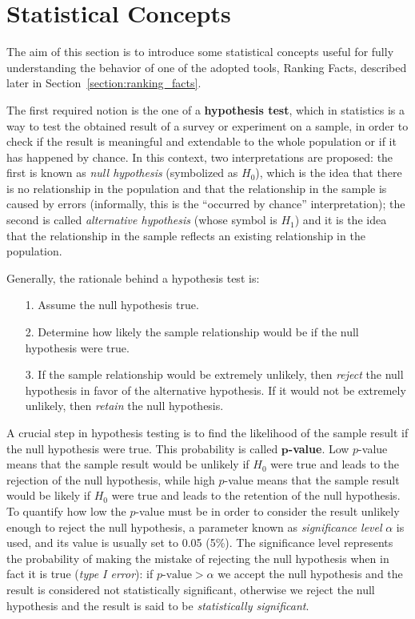\section{Statistical Concepts}
\label{section:statistical_concepts}
The aim of this section is to introduce some statistical concepts useful for fully understanding the behavior of one of the adopted tools, Ranking Facts, described later in Section~\ref{section:ranking_facts}.

The first required notion is the one of a \textbf{hypothesis test}, which in statistics is a way to test the obtained result of a survey or experiment on a sample, in order to check if the result is meaningful and extendable to the whole population or if it has happened by chance. In this context, two interpretations are proposed: the first is known as \textit{null hypothesis} (symbolized as \(H_0\)), which is the idea that there is no relationship in the population and that the relationship in the sample is caused by errors (informally, this is the ``occurred by chance'' interpretation); the second is called \textit{alternative hypothesis} (whose symbol is \(H_1\)) and it is the idea that the relationship in the sample reflects an existing relationship in the population.

Generally, the rationale behind a hypothesis test is:
\begin{itemize}
\item[1.] Assume the null hypothesis true.
\item[2.] Determine how likely the sample relationship would be if the null hypothesis were true.
\item[3.] If the sample relationship would be extremely unlikely, then \textit{reject} the null hypothesis in favor of the alternative hypothesis. If it would not be extremely unlikely, then \textit{retain} the null hypothesis.
\end{itemize}

A crucial step in hypothesis testing is to find the likelihood of the sample result if the null hypothesis were true. This probability is called \textbf{\(\bm{p}\)-value}. Low \(p\)-value means that the sample result would be unlikely if \(H_0\) were true and leads to the rejection of the null hypothesis, while high \(p\)-value means that the sample result would be likely if \(H_0\) were true and leads to the retention of the null hypothesis. To quantify how low the \(p\)-value must be in order to consider the result unlikely enough to reject the null hypothesis, a parameter known as \textit{significance level} \(\alpha\) is used, and its value is usually set to 0.05 (5\%). The significance level represents the probability of making the mistake of rejecting the null hypothesis when in fact it is true (\textit{type I error}): if \(p\textrm{-value} > \alpha\) we accept the null hypothesis and the result is considered not statistically significant, otherwise we reject the null hypothesis and the result is said to be \textit{statistically significant}.

